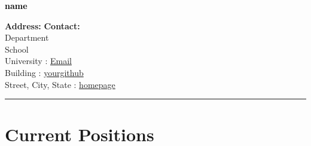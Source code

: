 \documentclass[11pt]{article} %
\begin{document}

{\Huge\bfseries \textcolor{black}{name}} \\
\bigskip 

\textbf{Address:} \hfill \textbf{Contact:} \\
Department \\
School \\ 
University \hfill {} : \href{mailto:mail}{Email}\\ %
Building  \hfill {} : \href{link}{yourgithub}\\ %
Street, City, State \hfill {} : \href{link}{homepage} \\
\noindent\rule{16cm}{0.4pt}

\vspace{0.001\textheight} %





\section*{Current Positions}
\end{document}

